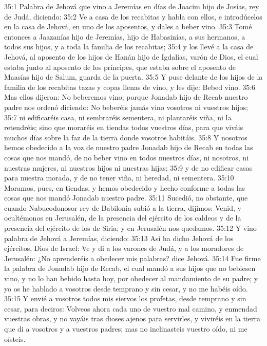 35:1 Palabra de Jehová que vino a Jeremías en días de Joacim hijo de Josías, rey de Judá, diciendo: 
35:2 Ve a casa de los recabitas y habla con ellos, e introdúcelos en la casa de Jehová, en uno de los aposentos, y dales a beber vino. 
35:3 Tomé entonces a Jaazanías hijo de Jeremías, hijo de Habasinías, a sus hermanos, a todos sus hijos, y a toda la familia de los recabitas; 
35:4 y los llevé a la casa de Jehová, al aposento de los hijos de Hanán hijo de Igdalías, varón de Dios, el cual estaba junto al aposento de los príncipes, que estaba sobre el aposento de Maasías hijo de Salum, guarda de la puerta. 
35:5 Y puse delante de los hijos de la familia de los recabitas tazas y copas llenas de vino, y les dije: Bebed vino. 
35:6 Mas ellos dijeron: No beberemos vino; porque Jonadab hijo de Recab nuestro padre nos ordenó diciendo: No beberéis jamás vino vosotros ni vuestros hijos; 
35:7 ni edificaréis casa, ni sembraréis sementera, ni plantaréis viña, ni la retendréis; sino que moraréis en tiendas todos vuestros días, para que viváis muchos días sobre la faz de la tierra donde vosotros habitáis. 
35:8 Y nosotros hemos obedecido a la voz de nuestro padre Jonadab hijo de Recab en todas las cosas que nos mandó, de no beber vino en todos nuestros días, ni nosotros, ni nuestras mujeres, ni nuestros hijos ni nuestras hijas; 
35:9 y de no edificar casas para nuestra morada, y de no tener viña, ni heredad, ni sementera. 
35:10 Moramos, pues, en tiendas, y hemos obedecido y hecho conforme a todas las cosas que nos mandó Jonadab nuestro padre. 
35:11 Sucedió, no obstante, que cuando Nabucodonosor rey de Babilonia subió a la tierra, dijimos: Venid, y ocultémonos en Jerusalén, de la presencia del ejército de los caldeos y de la presencia del ejército de los de Siria; y en Jerusalén nos quedamos. 
35:12 Y vino palabra de Jehová a Jeremías, diciendo: 
35:13 Así ha dicho Jehová de los ejércitos, Dios de Israel: Ve y di a los varones de Judá, y a los moradores de Jerusalén: ¿No aprenderéis a obedecer mis palabras? dice Jehová. 
35:14 Fue firme la palabra de Jonadab hijo de Recab, el cual mandó a sus hijos que no bebiesen vino, y no lo han bebido hasta hoy, por obedecer al mandamiento de su padre; y yo os he hablado a vosotros desde temprano y sin cesar, y no me habéis oído. 
35:15 Y envié a vosotros todos mis siervos los profetas, desde temprano y sin cesar, para deciros: Volveos ahora cada uno de vuestro mal camino, y enmendad vuestras obras, y no vayáis tras dioses ajenos para servirles, y viviréis en la tierra que di a vosotros y a vuestros padres; mas no inclinasteis vuestro oído, ni me oísteis. 
